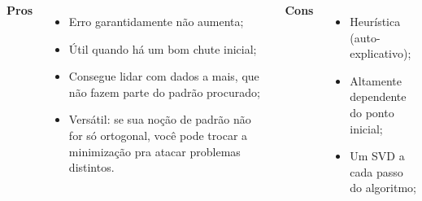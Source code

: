 \begin{frame}
  \begin{columns}
    \textbf{Pros}
    \begin{itemize}
      \item Erro garantidamente não aumenta;
      \item Útil quando há um bom chute inicial;
      \item Consegue lidar com dados a mais, que não fazem parte do padrão procurado;
      \item Versátil: se sua noção de padrão não for só ortogonal, você pode trocar a minimização pra atacar problemas distintos.
    \end{itemize}
    \textbf{Cons}
    \begin{itemize}
      \item Heurística (auto-explicativo);
      \item Altamente dependente do ponto inicial;
      \item Um SVD a cada passo do algoritmo;
    \end{itemize}
  \end{columns}
\end{frame}

